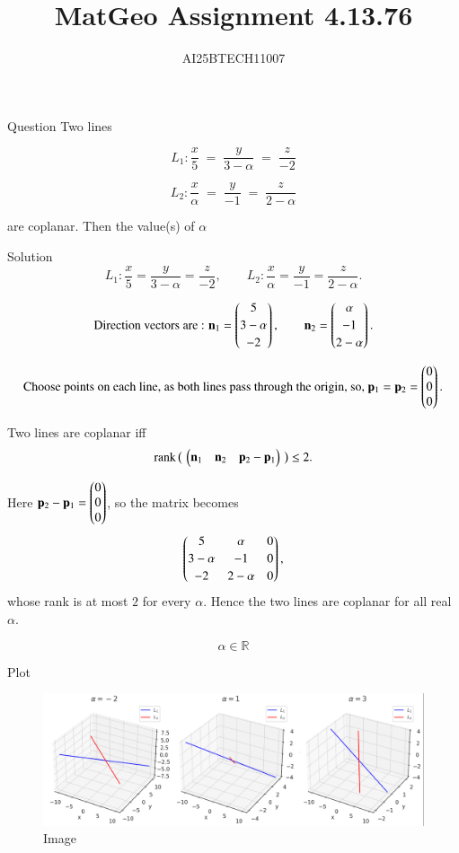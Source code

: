 \documentclass{beamer}
\title 
{MatGeo Assignment 4.13.76}
\author
{AI25BTECH11007}
\begin{document}
\frame{\titlepage}
\begin{frame}{Question}
Two lines

\[
L_1 : \frac{x}{5} \;=\; \frac{y}{3-\alpha} \;=\; \frac{z}{-2}
\]

\[
L_2 : \frac{x}{\alpha} \;=\; \frac{y}{-1} \;=\; \frac{z}{2-\alpha}
\]

are coplanar. Then the value(s) of \(\alpha\)
\end{frame}

\begin{frame}{Solution}
    \[
L_1 : \frac{x}{5}=\frac{y}{3-\alpha}=\frac{z}{-2},\qquad
L_2 : \frac{x}{\alpha}=\frac{y}{-1}=\frac{z}{2-\alpha}.
\]

\[
\text {Direction vectors are :   } 
\mathbf n_1=\begin{pmatrix}5\\[2pt]3-\alpha\\[2pt]-2\end{pmatrix},\qquad
\mathbf n_2=\begin{pmatrix}\alpha\\[2pt]-1\\[2pt]2-\alpha\end{pmatrix}.
\]

\[
\text{Choose points on each line, as both lines pass through the origin, so, }\\
\mathbf p_1=\mathbf p_2=\begin{pmatrix}0\\0\\0\end{pmatrix}.
\]

Two lines are coplanar iff
\[
\operatorname{rank}\big(\, \begin{pmatrix}\mathbf n_1 & \mathbf n_2 & \mathbf p_2-\mathbf p_1\end{pmatrix}\,\big)\le 2.
\]
\end{frame}
\begin{frame}
Here \(\mathbf p_2-\mathbf p_1=\begin{pmatrix}0\\0\\0\end{pmatrix}\), so the matrix becomes
\[
\begin{pmatrix}5 & \alpha & 0\\[2pt] 3-\alpha & -1 & 0\\[2pt] -2 & 2-\alpha & 0\end{pmatrix},
\]
whose rank is at most \(2\) for every \(\alpha\). Hence the two lines are coplanar for all real \(\alpha\).

\[
\boxed{\alpha\in\mathbb R}
\]

\end{frame}

\begin{frame}{Plot}
    \begin{figure}
        \centering
        \includegraphics[width=1\linewidth]{figs/image.png}
        \caption{Image}
        \label{fig:placeholder}
    \end{figure}
\end{frame}
\end{document}
